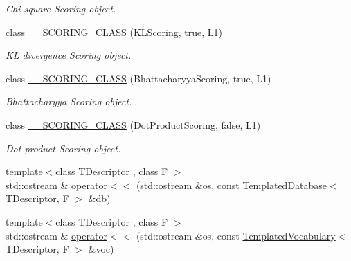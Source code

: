 \begin{DoxyCompactItemize}
\begin{DoxyCompactList}\small\item\em Chi square Scoring object. \end{DoxyCompactList}\item 
\mbox{\label{namespaceDBoW2_ae19b56aa4101670a2f019358dc621693}} 
class \hyperlink{namespaceDBoW2_ae19b56aa4101670a2f019358dc621693}{\+\_\+\+\_\+\+S\+C\+O\+R\+I\+N\+G\+\_\+\+C\+L\+A\+SS} (K\+L\+Scoring, true, L1)
\begin{DoxyCompactList}\small\item\em KL divergence Scoring object. \end{DoxyCompactList}\item 
\mbox{\label{namespaceDBoW2_a8b204afc23807ec9a07127d36e88e07f}} 
class \hyperlink{namespaceDBoW2_a8b204afc23807ec9a07127d36e88e07f}{\+\_\+\+\_\+\+S\+C\+O\+R\+I\+N\+G\+\_\+\+C\+L\+A\+SS} (Bhattacharyya\+Scoring, true, L1)
\begin{DoxyCompactList}\small\item\em Bhattacharyya Scoring object. \end{DoxyCompactList}\item 
\mbox{\label{namespaceDBoW2_ae07d9b48e6fefc0f0c01df371c17b3ca}} 
class \hyperlink{namespaceDBoW2_ae07d9b48e6fefc0f0c01df371c17b3ca}{\+\_\+\+\_\+\+S\+C\+O\+R\+I\+N\+G\+\_\+\+C\+L\+A\+SS} (Dot\+Product\+Scoring, false, L1)
\begin{DoxyCompactList}\small\item\em Dot product Scoring object. \end{DoxyCompactList}\item 
{\footnotesize template$<$class T\+Descriptor , class F $>$ }\\std\+::ostream \& \hyperlink{namespaceDBoW2_ac1f00f5484f61d6ab3b1f650955210d8}{operator$<$$<$} (std\+::ostream \&os, const \hyperlink{classDBoW2_1_1TemplatedDatabase}{Templated\+Database}$<$ T\+Descriptor, F $>$ \&db)
\item 
{\footnotesize template$<$class T\+Descriptor , class F $>$ }\\std\+::ostream \& \hyperlink{namespaceDBoW2_aecdf616fe16d2cf09f521a603b9d43f1}{operator$<$$<$} (std\+::ostream \&os, const \hyperlink{classDBoW2_1_1TemplatedVocabulary}{Templated\+Vocabulary}$<$ T\+Descriptor, F $>$ \&voc)
\end{DoxyCompactItemize}


